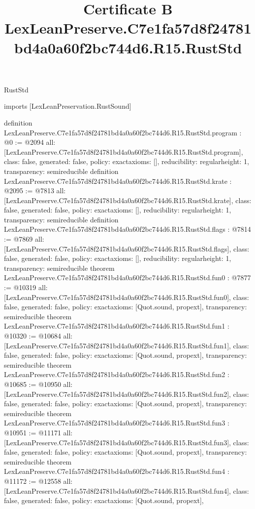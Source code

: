 \begin{lexlean}{RustStd}
\title{Certificate B LexLeanPreserve.C7e1fa57d8f24781bd4a0a60f2bc744d6.R15.RustStd}
\begin{coremodule}
imports [LexLeanPreservation.RustSound]

definition LexLeanPreserve.C7e1fa57d8f24781bd4a0a60f2bc744d6.R15.RustStd.program : @0 := @2094 {
  all: [LexLeanPreserve.C7e1fa57d8f24781bd4a0a60f2bc744d6.R15.RustStd.program],
  class: false,
  generated: false,
  policy: exact{axioms: []},
  reducibility: regular{height: 1},
  transparency: semireducible
}
definition LexLeanPreserve.C7e1fa57d8f24781bd4a0a60f2bc744d6.R15.RustStd.krate : @2095 := @7813 {
  all: [LexLeanPreserve.C7e1fa57d8f24781bd4a0a60f2bc744d6.R15.RustStd.krate],
  class: false,
  generated: false,
  policy: exact{axioms: []},
  reducibility: regular{height: 1},
  transparency: semireducible
}
definition LexLeanPreserve.C7e1fa57d8f24781bd4a0a60f2bc744d6.R15.RustStd.flags : @7814 := @7869 {
  all: [LexLeanPreserve.C7e1fa57d8f24781bd4a0a60f2bc744d6.R15.RustStd.flags],
  class: false,
  generated: false,
  policy: exact{axioms: []},
  reducibility: regular{height: 1},
  transparency: semireducible
}
theorem LexLeanPreserve.C7e1fa57d8f24781bd4a0a60f2bc744d6.R15.RustStd.fun0 : @7877 := @10319 {
  all: [LexLeanPreserve.C7e1fa57d8f24781bd4a0a60f2bc744d6.R15.RustStd.fun0],
  class: false,
  generated: false,
  policy: exact{axioms: [Quot.sound, propext]},
  transparency: semireducible
}
theorem LexLeanPreserve.C7e1fa57d8f24781bd4a0a60f2bc744d6.R15.RustStd.fun1 : @10320 := @10684 {
  all: [LexLeanPreserve.C7e1fa57d8f24781bd4a0a60f2bc744d6.R15.RustStd.fun1],
  class: false,
  generated: false,
  policy: exact{axioms: [Quot.sound, propext]},
  transparency: semireducible
}
theorem LexLeanPreserve.C7e1fa57d8f24781bd4a0a60f2bc744d6.R15.RustStd.fun2 : @10685 := @10950 {
  all: [LexLeanPreserve.C7e1fa57d8f24781bd4a0a60f2bc744d6.R15.RustStd.fun2],
  class: false,
  generated: false,
  policy: exact{axioms: [Quot.sound, propext]},
  transparency: semireducible
}
theorem LexLeanPreserve.C7e1fa57d8f24781bd4a0a60f2bc744d6.R15.RustStd.fun3 : @10951 := @11171 {
  all: [LexLeanPreserve.C7e1fa57d8f24781bd4a0a60f2bc744d6.R15.RustStd.fun3],
  class: false,
  generated: false,
  policy: exact{axioms: [Quot.sound, propext]},
  transparency: semireducible
}
theorem LexLeanPreserve.C7e1fa57d8f24781bd4a0a60f2bc744d6.R15.RustStd.fun4 : @11172 := @12558 {
  all: [LexLeanPreserve.C7e1fa57d8f24781bd4a0a60f2bc744d6.R15.RustStd.fun4],
  class: false,
  generated: false,
  policy: exact{axioms: [Quot.sound, propext]},
}
\end{coremodule}
\end{lexlean}
